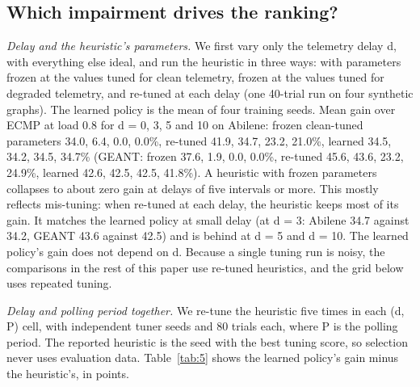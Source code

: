 \documentclass[journal]{IEEEtran}
\begin{document}
\subsection{Which impairment drives the ranking?}
\label{sec:6.2a}
\textit{Delay and the heuristic's parameters.} We first vary only the telemetry delay d, with everything else ideal, and run the heuristic in three ways: with parameters frozen at the values tuned for clean telemetry, frozen at the values tuned for degraded telemetry, and re-tuned at each delay (one 40-trial run on four synthetic graphs). The learned policy is the mean of four training seeds. Mean gain over ECMP at load 0.8 for d = 0, 3, 5 and 10 on Abilene: frozen clean-tuned parameters 34.0, 6.4, 0.0, 0.0\%, re-tuned 41.9, 34.7, 23.2, 21.0\%, learned 34.5, 34.2, 34.5, 34.7\% (GEANT: frozen 37.6, 1.9, 0.0, 0.0\%, re-tuned 45.6, 43.6, 23.2, 24.9\%, learned 42.6, 42.5, 42.5, 41.8\%). A heuristic with frozen parameters collapses to about zero gain at delays of five intervals or more. This mostly reflects mis-tuning: when re-tuned at each delay, the heuristic keeps most of its gain. It matches the learned policy at small delay (at d = 3: Abilene 34.7 against 34.2, GEANT 43.6 against 42.5) and is behind at d = 5 and d = 10. The learned policy's gain does not depend on d. Because a single tuning run is noisy, the comparisons in the rest of this paper use re-tuned heuristics, and the grid below uses repeated tuning.

\textit{Delay and polling period together.} We re-tune the heuristic five times in each (d, P) cell, with independent tuner seeds and 80 trials each, where P is the polling period. The reported heuristic is the seed with the best tuning score, so selection never uses evaluation data. Table~\ref{tab:5} shows the learned policy's gain minus the heuristic's, in points.

\begin{table}[!t]
\caption{Learned minus re-tuned heuristic gain (points) over the delay d and polling period P grid. Positive favours the learned policy. Zoo values average 10 graphs; Abilene and GEANT use the same evaluation windows as the delay comparison above.}
\label{tab:5}
\centering
\scriptsize
\renewcommand{\arraystretch}{1.05}
\end{table}
\end{document}
